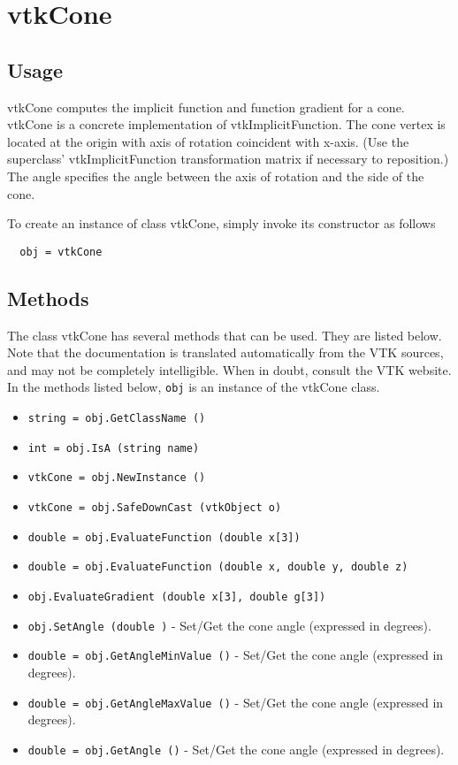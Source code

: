\section{vtkCone}

\subsection{Usage}

 vtkCone computes the implicit function and function gradient for a cone.
 vtkCone is a concrete implementation of vtkImplicitFunction. The cone vertex
 is located at the origin with axis of rotation coincident with x-axis. (Use
 the superclass' vtkImplicitFunction transformation matrix if necessary to 
 reposition.) The angle specifies the angle between the axis of rotation 
 and the side of the cone.

To create an instance of class vtkCone, simply
invoke its constructor as follows
\begin{verbatim}
  obj = vtkCone
\end{verbatim}
\subsection{Methods}

The class vtkCone has several methods that can be used.
  They are listed below.
Note that the documentation is translated automatically from the VTK sources,
and may not be completely intelligible.  When in doubt, consult the VTK website.
In the methods listed below, \verb|obj| is an instance of the vtkCone class.
\begin{itemize}
\item  \verb|string = obj.GetClassName ()|

\item  \verb|int = obj.IsA (string name)|

\item  \verb|vtkCone = obj.NewInstance ()|

\item  \verb|vtkCone = obj.SafeDownCast (vtkObject o)|

\item  \verb|double = obj.EvaluateFunction (double x[3])|

\item  \verb|double = obj.EvaluateFunction (double x, double y, double z)|

\item  \verb|obj.EvaluateGradient (double x[3], double g[3])|

\item  \verb|obj.SetAngle (double )| -  Set/Get the cone angle (expressed in degrees).

\item  \verb|double = obj.GetAngleMinValue ()| -  Set/Get the cone angle (expressed in degrees).

\item  \verb|double = obj.GetAngleMaxValue ()| -  Set/Get the cone angle (expressed in degrees).

\item  \verb|double = obj.GetAngle ()| -  Set/Get the cone angle (expressed in degrees).

\end{itemize}
